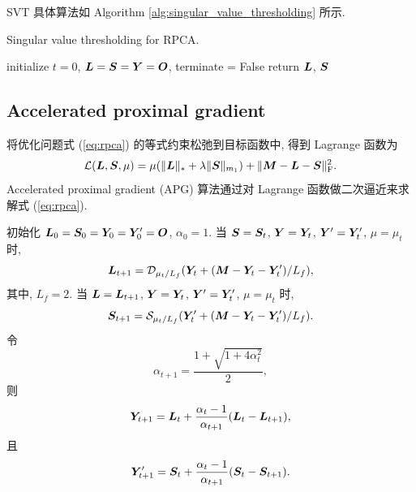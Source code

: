 \documentclass[12pt]{article}
\begin{document}
SVT 具体算法如 Algorithm \ref{alg:singular_value_thresholding} 所示.

\begin{algorithm}[!htbp]
  \label{alg:singular_value_thresholding}
  \caption{Singular value thresholding for RPCA.}
  initialize $t=0$, $\bm{L}=\bm{S}=\bm{Y}=\bm{O}$, terminate = False\;
  return $\bm{L}$, $\bm{S}$\;
\end{algorithm}

\subsection{Accelerated proximal gradient}

将优化问题式 (\ref{eq:rpca}) 的等式约束松弛到目标函数中, 得到 Lagrange 函数为
\begin{equation}
  \mathcal{L}(\bm{L},\bm{S},\mu)=\mu(\|\bm{L}\|_{*}+\lambda\|\bm{S}\|_{m_1})+\|\bm{M}-\bm{L}-\bm{S}\|_{\text{F}}^2.
\end{equation}
Accelerated proximal gradient (APG) \cite{lin2009fast} 算法通过对 Lagrange 函数做二次逼近来求解式 (\ref{eq:rpca}).

初始化 $\bm{L}_0=\bm{S}_0=\bm{Y}_0=\bm{Y}'_0=\bm{O}$, $\alpha_0=1$. 当 $\bm{S}=\bm{S}_{t}$, $\bm{Y}=\bm{Y}_t$, $\bm{Y}'=\bm{Y}'_t$, $\mu=\mu_t$ 时,
\begin{equation}
  \bm{L}_{t+1}
  =\mathcal{D}_{\mu_t/L_f}(\bm{Y}_t+(\bm{M}-\bm{Y}_t-\bm{Y}'_t)/L_f),
\end{equation}
其中, $L_f=2$. 当 $\bm{L}=\bm{L}_{t+1}$, $\bm{Y}=\bm{Y}_t$, $\bm{Y}'=\bm{Y}'_t$, $\mu=\mu_t$ 时,
\begin{equation}
  \bm{S}_{t+1}
  =\mathcal{S}_{\mu_t/L_f}(\bm{Y}'_t+(\bm{M}-\bm{Y}_t-\bm{Y}'_t)/L_f).
\end{equation}
令
\begin{equation}
  \alpha_{t+1}=\frac{1+\sqrt{1+4\alpha_t^2}}{2},
\end{equation}
则
\begin{equation}
  \bm{Y}_{t+1}=\bm{L}_t+\frac{\alpha_t-1}{\alpha_{t+1}}(\bm{L}_t-\bm{L}_{t+1}),
\end{equation}
且
\begin{equation}
  \bm{Y}'_{t+1}=\bm{S}_t+\frac{\alpha_t-1}{\alpha_{t+1}}(\bm{S}_t-\bm{S}_{t+1}).
\end{equation}
\end{document}
